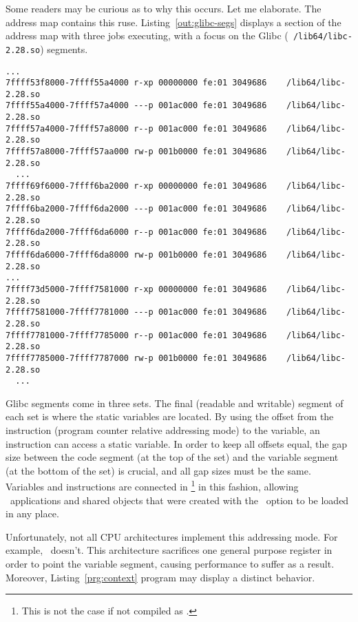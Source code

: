 Some readers may be curious as to why this occurs. Let me
elaborate. The address map contains this
ruse. Listing~\ref{out:glibc-segs} displays a section of the address
map with three jobs executing, with a focus on the Glibc  ({\tt
  /lib64/libc-2.28.so}) segments.  

\begin{lstlisting}[basicstyle=\tiny\tt, frame=tRBl, label=out:glibc-segs]
  ...
7ffff53f8000-7ffff55a4000 r-xp 00000000 fe:01 3049686    /lib64/libc-2.28.so
7ffff55a4000-7ffff57a4000 ---p 001ac000 fe:01 3049686    /lib64/libc-2.28.so
7ffff57a4000-7ffff57a8000 r--p 001ac000 fe:01 3049686    /lib64/libc-2.28.so
7ffff57a8000-7ffff57aa000 rw-p 001b0000 fe:01 3049686    /lib64/libc-2.28.so
  ...
7ffff69f6000-7ffff6ba2000 r-xp 00000000 fe:01 3049686    /lib64/libc-2.28.so
7ffff6ba2000-7ffff6da2000 ---p 001ac000 fe:01 3049686    /lib64/libc-2.28.so
7ffff6da2000-7ffff6da6000 r--p 001ac000 fe:01 3049686    /lib64/libc-2.28.so
7ffff6da6000-7ffff6da8000 rw-p 001b0000 fe:01 3049686    /lib64/libc-2.28.so
...
7ffff73d5000-7ffff7581000 r-xp 00000000 fe:01 3049686    /lib64/libc-2.28.so
7ffff7581000-7ffff7781000 ---p 001ac000 fe:01 3049686    /lib64/libc-2.28.so
7ffff7781000-7ffff7785000 r--p 001ac000 fe:01 3049686    /lib64/libc-2.28.so
7ffff7785000-7ffff7787000 rw-p 001b0000 fe:01 3049686    /lib64/libc-2.28.so
  ...
\end{lstlisting}

Glibc segments come in three sets. The final (readable and writable)
segment of each set is where the static variables are located. By
using the offset from the instruction (program counter relative
addressing mode) to the variable, an instruction can access a static
variable. In order to keep all offsets equal, the gap size between the
code segment (at the top of the set) and the variable segment (at the
bottom of the set) is crucial, and all gap sizes must be the
same. Variables and instructions are connected in \PIE\footnote{This is
not the case if not compiled as \PIE.} in this 
fashion, allowing \PIE\ applications and shared objects that were
created with the \PIC\ option to be loaded in any place.

Unfortunately, not all CPU architectures implement this addressing
mode. For example, \INTEL\ doesn't. This architecture sacrifices one
general purpose register in order to point the variable segment,
causing performance to suffer as a result. Moreover,
Listing~\ref{prg:context} program may display a distinct behavior.
